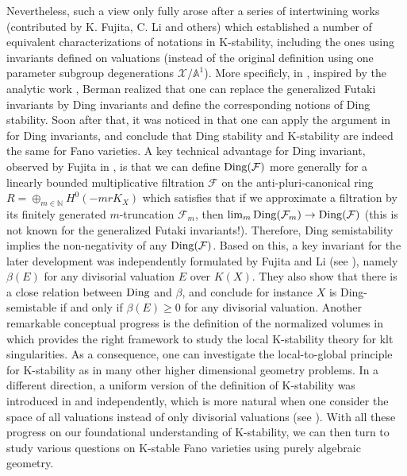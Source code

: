 \documentclass[12pt,reqno]{amsart}%
\newcommand{\bA}{{\mathbb{A} }}
\newcommand{\cX}{{\mathcal{X}}}
\newcommand{\cF}{\mathcal{F}}
\theoremstyle{definition}
\theoremstyle{remark}
\newcommand{\Ding}{{\rm Ding}}
\begin{document}
Nevertheless, such a view only fully arose after a series of intertwining works (contributed by K. Fujita, C. Li and others) which established a number of equivalent characterizations of notations in K-stability, including the ones using invariants defined on valuations (instead of the original definition using one parameter subgroup degenerations $\cX/\bA^1$). More specificly, in \cite{Ber16}, inspired by the analytic work \cite{Din88}, Berman realized that one can replace the generalized Futaki invariants by Ding invariants and define the corresponding notions of Ding stability. Soon after that, it was noticed in \cite{BBJ15, Fuj19b} that one can apply the argument in \cite{LX14} for Ding invariants, and conclude that Ding stability and K-stability are indeed the same for Fano varieties. A key technical advantage for Ding invariant, observed by Fujita in \cite{Fuj18}, is that we can define $\Ding(\cF)$ more generally for a linearly bounded multiplicative filtration $\cF$ on the anti-pluri-canonical ring $R=\oplus_{m\in \mathbb N} H^0(-mrK_X)$ which satisfies that if we approximate a filtration by its finitely generated $m$-truncation $\cF_m$, then $\lim_m\Ding(\cF_m)\to \Ding (\cF)$ (this is not known for the generalized Futaki invariants!). Therefore, Ding semistability implies the non-negativity of any $\Ding(\cF)$.
Based on this, a key invariant for the later development  was independently formulated by  Fujita and Li (see \cite{Fuj19b,Li18}), namely $\beta(E)$ for any divisorial valuation $E$ over $K(X)$. They also show that there is a close relation between $\Ding$ and $\beta$, and conclude for instance $X$ is Ding-semistable if and only if $\beta(E)\ge 0$ for any divisorial valuation.   Another remarkable conceptual progress is the definition of the normalized volumes  in \cite{Li18} which provides the right framework to study the local K-stability theory for klt singularities. As a consequence, one can investigate the local-to-global principle for K-stability as in many other higher dimensional geometry problems.   In a different direction, a uniform version of the definition of K-stability was introduced in \cite{BHJ17} and \cite{Der16} independently, which is more natural when one consider the space of all valuations instead of only divisorial valuations (see \cite{BJ20, BX19}).   With all these progress on our foundational understanding of K-stability, we can then turn to study various questions on K-stable Fano varieties using purely algebraic geometry.  

\smallskip
 
\end{document}
